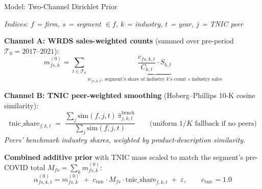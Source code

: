 \documentclass[aspectratio=169]{beamer}
\begin{document}

\begin{frame}{Model: Two-Channel Dirichlet Prior}

  \small\textit{Indices: $f$ = firm, $s$ = segment $\in f$, $k$ = industry, $t$ = year, $j$ = TNIC peer}

  \vspace{0.4em}

  \textbf{Channel A: WRDS sales-weighted counts} (summed over pre-period $\mathcal{T}_0 = 2017$--$2021$):
  \[
    m_{fs,k}^{(0)} = \sum_{t\in\mathcal{T}_0}
      \underbrace{\frac{c_{fs,k,t}}{C_{k,t}} \cdot S_{k,t}}_{w_{fs,k,t}:\;\text{segment's share of industry }k\text{'s count} \times \text{industry sales}}
  \]

  \textbf{Channel B: TNIC peer-weighted smoothing} (Hoberg–Phillips 10-K cosine similarity):
  \[
    \mathrm{tnic\_share}_{f,k,t} \;=\;
      \frac{\sum_{j} \mathrm{sim}(f,j,t)\,\hat\pi^{\text{bench}}_{j,k,t}}{\sum_{j} \mathrm{sim}(f,j,t)}
    \qquad \text{(uniform } 1/K \text{ fallback if no peers)}
  \]
  \textit{Peers' benchmark industry shares, weighted by product-description similarity.}

  \vspace{0.3em}

  \textbf{Combined additive prior} with TNIC mass scaled to match the segment's pre-COVID total $M_{fs} = \sum_k m_{fs,k}^{(0)}$:
  \[
    \alpha_{fs,k,t}^{(0)} = m_{fs,k}^{(0)} \;+\; c_{\text{tnic}}\cdot M_{fs}\cdot \mathrm{tnic\_share}_{f,k,t} \;+\; \varepsilon,
    \qquad c_{\text{tnic}} = 1.0
  \]

\end{frame}

\end{document}
